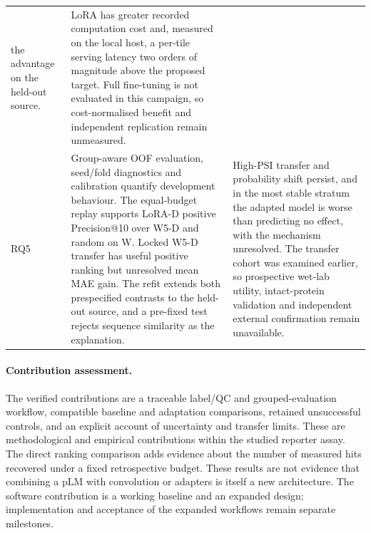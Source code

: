 \begin{longtable}{P{1.0cm}P{6.0cm}P{6.0cm}}
  the advantage on the held-out source. & LoRA has greater recorded computation cost and, measured
  on the local host, a per-tile serving latency two orders of magnitude above the proposed target.
  Full fine-tuning is not evaluated in this campaign, so cost-normalised benefit and independent
  replication remain unmeasured. \\[4pt]
  RQ5 & Group-aware OOF evaluation, seed/fold diagnostics and calibration quantify development
  behaviour. The equal-budget replay supports LoRA-D positive Precision@10 over W5-D and random
  on W. Locked W5-D transfer has useful positive ranking but unresolved mean MAE gain. The refit
  extends both prespecified contrasts to the held-out source, and a pre-fixed test rejects sequence
  similarity as the explanation. & High-PSI transfer and probability shift persist, and in the most
  stable stratum the adapted model is worse than predicting no effect, with the mechanism
  unresolved. The transfer cohort was examined earlier, so prospective wet-lab utility,
  intact-protein validation and independent external confirmation remain unavailable. \\
  \bottomrule
\end{longtable}

\paragraph{Contribution assessment.}
The verified contributions are a traceable label/QC and grouped-evaluation workflow, compatible
baseline and adaptation comparisons, retained unsuccessful controls, and an explicit account of
uncertainty and transfer limits. These are methodological and empirical contributions within the
studied reporter assay. The direct ranking comparison adds evidence about the number of measured
hits recovered under a fixed retrospective budget. These results are not evidence that combining a pLM with convolution or adapters is
itself a new architecture. The software contribution is a working baseline and an expanded design;
implementation and acceptance of the expanded workflows remain separate milestones.

